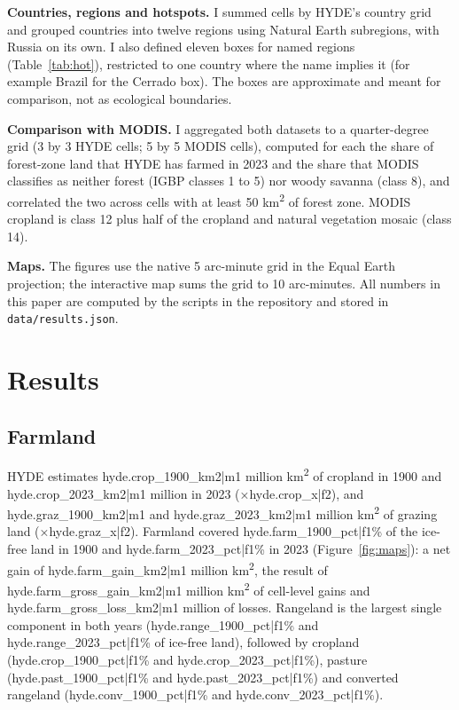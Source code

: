 \documentclass[11pt,a4paper]{article}
\begin{document}
\textbf{Countries, regions and hotspots.} I summed cells by HYDE's country grid and grouped countries into twelve regions using Natural Earth subregions, with Russia on its own. I also defined eleven boxes for named regions (Table~\ref{tab:hot}), restricted to one country where the name implies it (for example Brazil for the Cerrado box). The boxes are approximate and meant for comparison, not as ecological boundaries.

\textbf{Comparison with MODIS.} I aggregated both datasets to a quarter-degree grid (3 by 3 HYDE cells; 5 by 5 MODIS cells), computed for each the share of forest-zone land that HYDE has farmed in 2023 and the share that MODIS classifies as neither forest (IGBP classes 1 to 5) nor woody savanna (class 8), and correlated the two across cells with at least 50 km\textsuperscript{2} of forest zone. MODIS cropland is class 12 plus half of the cropland and natural vegetation mosaic (class 14).

\textbf{Maps.} The figures use the native 5 arc-minute grid in the Equal Earth projection; the interactive map sums the grid to 10 arc-minutes. All numbers in this paper are computed by the scripts in the repository and stored in \texttt{data/results.json}.

\section{Results}
\subsection{Farmland}
HYDE estimates {{hyde.crop_1900_km2|m1}} million km\textsuperscript{2} of cropland in 1900 and {{hyde.crop_2023_km2|m1}} million in 2023 (×{{hyde.crop_x|f2}}), and {{hyde.graz_1900_km2|m1}} and {{hyde.graz_2023_km2|m1}} million km\textsuperscript{2} of grazing land (×{{hyde.graz_x|f2}}). Farmland covered {{hyde.farm_1900_pct|f1}}\% of the ice-free land in 1900 and {{hyde.farm_2023_pct|f1}}\% in 2023 (Figure~\ref{fig:maps}): a net gain of {{hyde.farm_gain_km2|m1}} million km\textsuperscript{2}, the result of {{hyde.farm_gross_gain_km2|m1}} million km\textsuperscript{2} of cell-level gains and {{hyde.farm_gross_loss_km2|m1}} million of losses. Rangeland is the largest single component in both years ({{hyde.range_1900_pct|f1}}\% and {{hyde.range_2023_pct|f1}}\% of ice-free land), followed by cropland ({{hyde.crop_1900_pct|f1}}\% and {{hyde.crop_2023_pct|f1}}\%), pasture ({{hyde.past_1900_pct|f1}}\% and {{hyde.past_2023_pct|f1}}\%) and converted rangeland ({{hyde.conv_1900_pct|f1}}\% and {{hyde.conv_2023_pct|f1}}\%).
\end{document}
